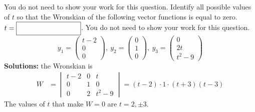 \ifnum {}
\question[1] You do not need to show your work for this question. Identify all possible values of $t$ so that the Wronskian of the following vector functions is equal to zero. $t = \framebox{\strut\hspace{3cm}}$. You do not need to show your work for this question. 
$$y_1 = \begin{pmatrix} t-2\\0\\0\end{pmatrix}, \ y_2 = \begin{pmatrix} 0\\1\\0\end{pmatrix}, \ y_3 = \begin{pmatrix} 0\\2t\\t^2-9 \end{pmatrix}$$
\ifnum {} {\color{DarkBlue} 
\textbf{Solutions:} the Wronskian is
\begin{align}
    W &= \begin{vmatrix} t-2&0&t\\0&1&0\\0&2&t^2-9 \end{vmatrix} 
    = (t-2)\cdot 1 \cdot (t+3)(t-3) 
\end{align}
The values of $t$ that make $W=0$ are $t = 2,\pm 3$.
} 
\else 
\vspace{5cm}
\fi
\fi